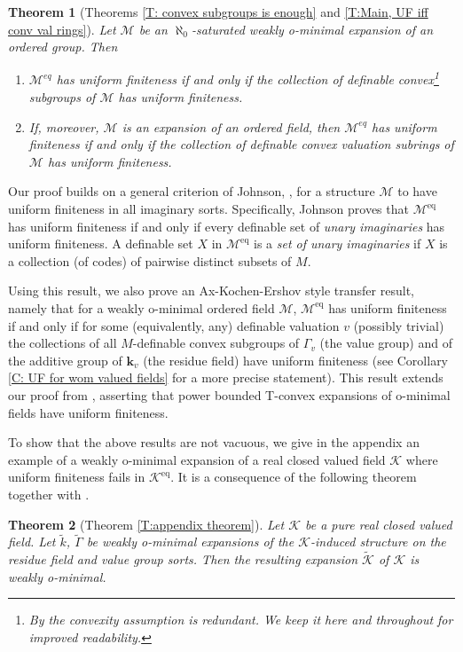 \documentclass[11pt]{amsart}
\DeclareMathOperator{\eq}{eq}
\newtheorem{introtheorem}{Theorem}
\theoremstyle{definition}
\newcommand{\bk}{\textbf{k}}
\newcommand{\CK}{{\mathcal K}}
\newcommand{\CM}{{\mathcal M}}
\newcommand{\0}{\emptyset}
\begin{document}
\begin{introtheorem}[Theorems \ref{T: convex subgroups is enough} and \ref{T:Main, UF iff conv val rings}]
    Let $\CM$ be an $\aleph_0$-saturated weakly o-minimal expansion of an ordered group. Then 
    \begin{enumerate}
        \item $\CM^{eq}$ has uniform finiteness if and only if the collection of definable convex\footnote{By \cite[Lemma 5.2]{MacMaSt} the convexity assumption is redundant. We keep it here and throughout for improved readability.}  subgroups of $\CM$ has uniform finiteness. 
        \item If, moreover,  $\CM$ is an expansion of an ordered field, then $\CM^{eq}$ has uniform finiteness if and only if the collection of  definable convex valuation subrings of $\CM$ has uniform finiteness.  
    \end{enumerate}
\end{introtheorem}
Our proof builds on a general criterion of Johnson, \cite[Theorem 2.3]{JohnUF}, for a structure $\CM$ to have uniform finiteness in all imaginary sorts. Specifically, Johnson proves that $\CM^{\eq}$ has uniform finiteness if and only if every definable set of \emph{unary imaginaries} has uniform finiteness. A definable set $X$ in $\CM^{\eq}$ is a {\em set of unary imaginaries} if $X$ is a collection (of codes)  of pairwise distinct subsets of $M$.

Using this result, we also prove an Ax-Kochen-Ershov style transfer result, namely that for a weakly o-minimal ordered field $\CM$, $\CM^{\eq}$ has uniform finiteness if and only if for some (equivalently, any) definable valuation $v$ (possibly trivial) the collections of all $M$-definable convex subgroups of $\Gamma_v$ (the value group) and of the additive group of $\bk_v$ (the residue field) have uniform finiteness (see Corollary \ref{C: UF for wom valued fields} for a more precise statement). This result extends our proof from \cite{HaHaPeGps}, asserting that power bounded T-convex expansions of o-minimal fields have uniform finiteness. 

To show that the above results are not vacuous, we give in the appendix an example of a weakly o-minimal expansion of a real closed valued field $\CK$ where uniform finiteness fails in $\CK^{\eq}$. It is a consequence of the following theorem together with  \cite[Example A.6]{HaHaPeSs}.

\begin{introtheorem}[Theorem \ref{T:appendix theorem}]
   Let $\CK$ be a pure real closed valued field. Let $\tilde k$, $\tilde \Gamma$ be weakly o-minimal expansions of the $\CK$-induced structure on the residue field and value group sorts. Then the resulting expansion  $\widetilde{\CK}$ of $\CK$ is weakly o-minimal. 
\end{introtheorem}
\end{document}
